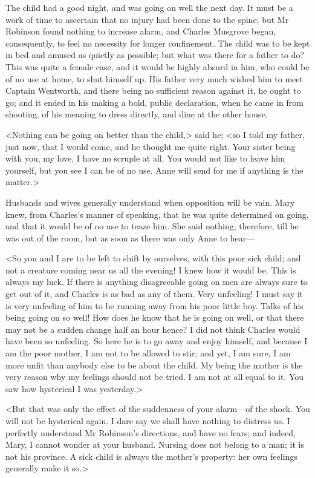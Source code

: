 The child had a good night, and was going on well the next day. It must be a work of time to ascertain that no injury had been done to the spine; but Mr Robinson found nothing to increase alarm, and Charles Musgrove began, consequently, to feel no necessity for longer confinement. The child was to be kept in bed and amused as quietly as possible; but what was there for a father to do? This was quite a female case, and it would be highly absurd in him, who could be of no use at home, to shut himself up. His father very much wished him to meet Captain Wentworth, and there being no sufficient reason against it, he ought to go; and it ended in his making a bold, public declaration, when he came in from shooting, of his meaning to dress directly, and dine at the other house.

<Nothing can be going on better than the child,> said he; <so I told my father, just now, that I would come, and he thought me quite right. Your sister being with you, my love, I have no scruple at all. You would not like to leave him yourself, but you see I can be of no use. Anne will send for me if anything is the matter.>

Husbands and wives generally understand when opposition will be vain. Mary knew, from Charles's manner of speaking, that he was quite determined on going, and that it would be of no use to teaze him. She said nothing, therefore, till he was out of the room, but as soon as there was only Anne to hear—

<So you and I are to be left to shift by ourselves, with this poor sick child; and not a creature coming near us all the evening! I knew how it would be. This is always my luck. If there is anything disagreeable going on men are always sure to get out of it, and Charles is as bad as any of them. Very unfeeling! I must say it is very unfeeling of him to be running away from his poor little boy. Talks of his being going on so well! How does he know that he is going on well, or that there may not be a sudden change half an hour hence? I did not think Charles would have been so unfeeling. So here he is to go away and enjoy himself, and because I am the poor mother, I am not to be allowed to stir; and yet, I am sure, I am more unfit than anybody else to be about the child. My being the mother is the very reason why my feelings should not be tried. I am not at all equal to it. You saw how hysterical I was yesterday.>

<But that was only the effect of the suddenness of your alarm—of the shock. You will not be hysterical again. I dare say we shall have nothing to distress us. I perfectly understand Mr Robinson's directions, and have no fears; and indeed, Mary, I cannot wonder at your husband. Nursing does not belong to a man; it is not his province. A sick child is always the mother's property: her own feelings generally make it so.>

